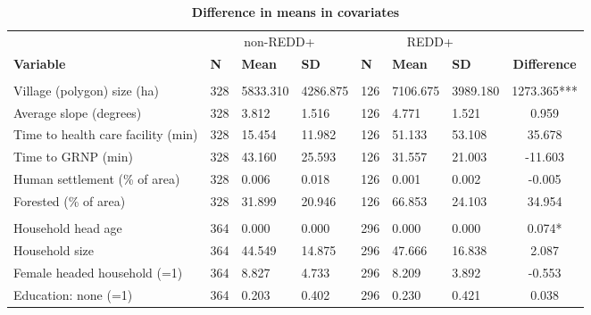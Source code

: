 \documentclass[
]{article}
\begin{document}
\begin{table}[!h]

\caption{\label{tab:tabSumstatsCov}\textbf{Difference in means in covariates}}
\centering
\begin{threeparttable}
\begin{tabular}[t]{lllllllc}
\toprule
\multicolumn{1}{c}{ } & \multicolumn{3}{c}{non-REDD+} & \multicolumn{3}{c}{REDD+} & \multicolumn{1}{c}{ } \\
\cmidrule(l{3pt}r{3pt}){2-4} \cmidrule(l{3pt}r{3pt}){5-7}
\textbf{Variable} & \textbf{N} & \textbf{Mean} & \textbf{SD} & \textbf{N} & \textbf{Mean} & \textbf{SD} & \textbf{Difference}\\
\midrule
\addlinespace[0.3em]
\multicolumn{8}{l}{\textbf{Village-level covariates}}\\
\hspace{1em}Village (polygon) size (ha) & 328 & 5833.310 & 4286.875 & 126 & 7106.675 & 3989.180 & 1273.365***\\
\hspace{1em}Average slope (degrees) & 328 & 3.812 & 1.516 & 126 & 4.771 & 1.521 & 0.959\\
\hspace{1em}Time to health care facility (min) & 328 & 15.454 & 11.982 & 126 & 51.133 & 53.108 & 35.678\\
\hspace{1em}Time to GRNP (min) & 328 & 43.160 & 25.593 & 126 & 31.557 & 21.003 & -11.603\\
\hspace{1em}Human settlement (\% of area) & 328 & 0.006 & 0.018 & 126 & 0.001 & 0.002 & -0.005\\
\hspace{1em}Forested (\% of area) & 328 & 31.899 & 20.946 & 126 & 66.853 & 24.103 & 34.954\\
\addlinespace[0.3em]
\multicolumn{8}{l}{\textbf{Household-level covariates}}\\
\hspace{1em}Household head age & 364 & 0.000 & 0.000 & 296 & 0.000 & 0.000 & 0.074*\\
\hspace{1em}Household size & 364 & 44.549 & 14.875 & 296 & 47.666 & 16.838 & 2.087\\
\hspace{1em}Female headed household (=1) & 364 & 8.827 & 4.733 & 296 & 8.209 & 3.892 & -0.553\\
\hspace{1em}Education: none (=1) & 364 & 0.203 & 0.402 & 296 & 0.230 & 0.421 & 0.038\\

\end{tabular}
\end{threeparttable}
\end{table}
\end{document}
